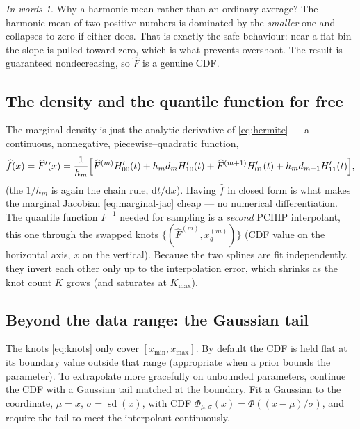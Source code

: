 \documentclass[11pt]{article}
\newcommand{\Fhat}{\widehat{F}}
\newcommand{\fhat}{\widehat{f}}
\DeclareMathOperator{\sd}{sd}
\theoremstyle{remark}
\newtheorem*{plain}{In words}
\begin{document}
\begin{plain}
Why a harmonic mean rather than an ordinary average? The harmonic mean of two
positive numbers is dominated by the \emph{smaller} one and collapses to zero if
either does. That is exactly the safe behaviour: near a flat bin the slope is
pulled toward zero, which is what prevents overshoot. The result is guaranteed
nondecreasing, so $\Fhat$ is a genuine CDF.
\end{plain}

\subsection{The density and the quantile function for free}

The marginal density is just the analytic derivative of \eqref{eq:hermite} --- a
continuous, nonnegative, piecewise--quadratic function,
\begin{equation}
\label{eq:pdf}
\fhat(x)=\Fhat'(x)=\frac{1}{h_m}\Bigl[\Fhat^{(m)}H_{00}'(t)+h_m d_m H_{10}'(t)
+\Fhat^{(m+1)}H_{01}'(t)+h_m d_{m+1}H_{11}'(t)\Bigr],
\end{equation}
(the $1/h_m$ is again the chain rule, $\mathrm{d}t/\mathrm{d}x$). Having $\fhat$
in closed form is what makes the marginal Jacobian \eqref{eq:marginal-jac} cheap
--- no numerical differentiation. The quantile function $F^{-1}$ needed for
sampling is a \emph{second} PCHIP interpolant, this one through the swapped knots
$\{(\Fhat^{(m)},x_g^{(m)})\}$ (CDF value on the horizontal axis, $x$ on the
vertical). Because the two splines are fit independently, they invert each other
only up to the interpolation error, which shrinks as the knot count $K$ grows
(and saturates at $K_{\max}$).

\subsection{Beyond the data range: the Gaussian tail}
\label{sec:tail}

The knots \eqref{eq:knots} only cover $[x_{\min},x_{\max}]$. By default the CDF
is held flat at its boundary value outside that range (appropriate when a prior
bounds the parameter). To extrapolate more gracefully on unbounded parameters,
continue the CDF with a Gaussian tail matched at the boundary. Fit a Gaussian to
the coordinate, $\mu=\bar x$, $\sigma=\sd(x)$, with CDF
$\Phi_{\mu,\sigma}(x)=\Phi((x-\mu)/\sigma)$, and require the tail to meet the
interpolant continuously.
\end{document}
